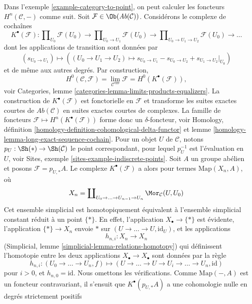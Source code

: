 \begin{example}
\label{example-right-derived-limits}
Dans l'exemple \ref{example-category-to-point}, on peut calculer les
foncteurs $H^n(\mathcal{C}, -)$ comme suit. Soit
$\mathcal{F} \in \Ob(\textit{Ab}(\mathcal{C}))$. Considérons le complexe de
cochaînes
$$
K^\bullet(\mathcal{F}) :
\prod\nolimits_{U_0} \mathcal{F}(U_0)
\to
\prod\nolimits_{U_0 \to U_1} \mathcal{F}(U_0)
\to
\prod\nolimits_{U_0 \to U_1 \to U_2} \mathcal{F}(U_0)
\to \ldots
$$
dont les applications de transition sont données par
$$
(s_{U_0 \to U_1})
\longmapsto
((U_0 \to U_1 \to U_2) \mapsto s_{U_0 \to U_1} - s_{U_0 \to U_2}
+ s_{U_1 \to U_2}|_{U_0})
$$
et de même aux autres degrés. Par construction,
$$
H^0(\mathcal{C}, \mathcal{F}) =
\lim_{\mathcal{C}^{opp}} \mathcal{F} =
H^0(K^\bullet(\mathcal{F})),
$$
voir Categories, lemme
\ref{categories-lemma-limits-products-equalizers}. La construction de
$K^\bullet(\mathcal{F})$ est fonctorielle en $\mathcal{F}$ et transforme les
suites exactes courtes de $\textit{Ab}(\mathcal{C})$ en suites exactes
courtes de complexes. La famille de foncteurs
$\mathcal{F} \mapsto H^n(K^\bullet(\mathcal{F}))$ forme donc un
$\delta$-foncteur, voir Homology, définition
\ref{homology-definition-cohomological-delta-functor} et lemme
\ref{homology-lemma-long-exact-sequence-cochain}. Pour un objet $U$ de
$\mathcal{C}$, notons $p_U : \Sh(*) \to \Sh(\mathcal{C})$ le point
correspondant, pour lequel $p_U^{-1}$ est l'évaluation en $U$, voir Sites,
exemple \ref{sites-example-indiscrete-points}. Soit $A$ un groupe abélien et
posons $\mathcal{F} = p_{U, *}A$. Le complexe $K^\bullet(\mathcal{F})$ a alors
pour termes $\text{Map}(X_n, A)$, où
$$
X_n = \coprod\nolimits_{U_0 \to \ldots \to U_{n - 1} \to U_n}
\Mor_\mathcal{C}(U, U_0)
$$
Cet ensemble simplicial est homotopiquement équivalent à l'ensemble
simplicial constant réduit à un point $\{*\}$. En effet, l'application
$X_\bullet \to \{*\}$ est évidente, l'application $\{*\} \to X_n$ envoie
$*$ sur $(U \to \ldots \to U, \text{id}_U)$, et les applications
$$
h_{n, i} : X_n \longrightarrow X_n
$$
(Simplicial, lemme \ref{simplicial-lemma-relations-homotopy}) qui définissent
l'homotopie entre les deux applications
$X_\bullet \to X_\bullet$ sont données par la règle
$$
h_{n, i} :
(U_0 \to \ldots \to U_n, f)
\longmapsto
(U \to \ldots \to U \to U_i \to \ldots \to U_n, \text{id})
$$
pour $i > 0$, et $h_{n, 0} = \text{id}$. Nous omettons les vérifications.
Comme $\text{Map}(-, A)$ est un foncteur contravariant, il s'ensuit que
$K^\bullet(p_{U, *}A)$ a une cohomologie nulle en degrés strictement positifs

\end{example}

